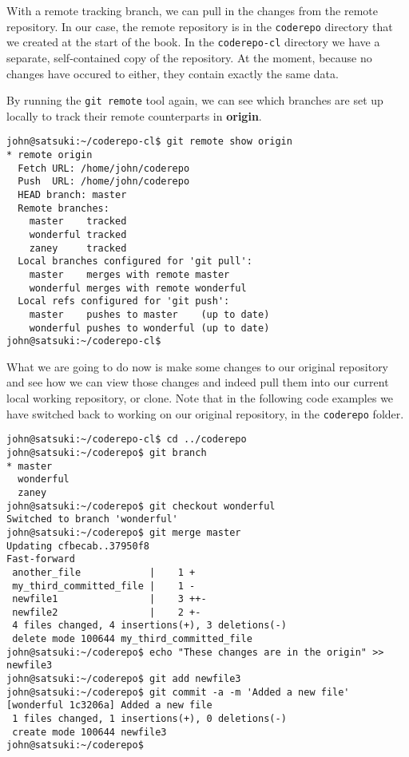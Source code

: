 With a remote tracking branch, we can pull in the changes from the remote repository.  In our case, the remote repository is in the \texttt{coderepo} directory that we created at the start of the book.  In the \texttt{coderepo-cl} directory we have a separate, self-contained copy of the repository.  At the moment, because no changes have occured to either, they contain exactly the same data.

By running the \texttt{git remote} tool again, we can see which branches are set up locally to track their remote counterparts in \textbf{origin}.

\begin{Verbatim}[frame=leftline,framerule=1mm,fontsize=\relsize{-3}] 
john@satsuki:~/coderepo-cl$ git remote show origin
* remote origin
  Fetch URL: /home/john/coderepo
  Push  URL: /home/john/coderepo
  HEAD branch: master
  Remote branches:
    master    tracked
    wonderful tracked
    zaney     tracked
  Local branches configured for 'git pull':
    master    merges with remote master
    wonderful merges with remote wonderful
  Local refs configured for 'git push':
    master    pushes to master    (up to date)
    wonderful pushes to wonderful (up to date)
john@satsuki:~/coderepo-cl$ 
\end{Verbatim}

What we are going to do now is make some changes to our original repository and see how we can view those changes and indeed pull them into our current local working repository, or clone.  Note that in the following code examples we have switched back to working on our original repository, in the \texttt{coderepo} folder.

\begin{Verbatim}[frame=leftline,framerule=1mm,fontsize=\relsize{-3}] 
john@satsuki:~/coderepo-cl$ cd ../coderepo
john@satsuki:~/coderepo$ git branch
* master
  wonderful
  zaney
john@satsuki:~/coderepo$ git checkout wonderful 
Switched to branch 'wonderful'
john@satsuki:~/coderepo$ git merge master
Updating cfbecab..37950f8
Fast-forward
 another_file            |    1 +
 my_third_committed_file |    1 -
 newfile1                |    3 ++-
 newfile2                |    2 +-
 4 files changed, 4 insertions(+), 3 deletions(-)
 delete mode 100644 my_third_committed_file
john@satsuki:~/coderepo$ echo "These changes are in the origin" >> newfile3
john@satsuki:~/coderepo$ git add newfile3
john@satsuki:~/coderepo$ git commit -a -m 'Added a new file'
[wonderful 1c3206a] Added a new file
 1 files changed, 1 insertions(+), 0 deletions(-)
 create mode 100644 newfile3
john@satsuki:~/coderepo$ 
\end{Verbatim}

